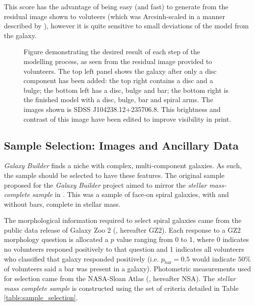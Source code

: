 \documentclass[../main.tex]{subfiles}
\begin{document}
This score has the advantage of being easy (and fast) to generate from the residual image shown to voluteers (which was Arcsinh-scaled in a manner described by \citealt{Lupton2003:astro-ph/0312483v1}), however it is quite sensitive to small deviations of the model from the galaxy.

\begin{figure}
  \caption{Figure demonstrating the desired result of each step of the modelling process, as seen from the residual image provided to volunteers. The top left panel shows the galaxy after only a disc component has been added: the top right contains a disc and a bulge; the bottom left has a disc, bulge and bar; the bottom right is the finished model with a disc, bulge, bar and spiral arms. The images shown is SDSS J104238.12+235706.8. This brightness and contrast of this image have been edited to improve visibility in print.}
  \label{fig:residualsStepByStep}
\end{figure}


\subsection{Sample Selection: Images and Ancillary Data}
\label{sec:data}

\textit{Galaxy Builder} finds a niche with complex, multi-component galaxies. As such, the sample should be selected to have these features. The original sample proposed for the \textit{Galaxy Builder} project aimed to mirror the \textit{stellar mass-complete sample} in \citet{2017MNRAS.472.2263H}. This was a sample of face-on spiral galaxies, with and without bars, complete in  stellar mass.

The morphological information required to select spiral galaxies came from the public data release of Galaxy Zoo 2 (\citealt{Willett2013:1308.3496v2}, hereafter GZ2). Each response to a GZ2 morphology question is allocated a $p$ value ranging from 0 to 1, where 0 indicates no volunteers responed positively to that question and 1 indicates all volunteers who classified that galaxy responded positively (i.e. $p_\text{bar} = 0.5$ would indicate $50\%$ of volunteers said a bar was present in a galaxy). Photometric measurements used for selection came from the NASA-Sloan Atlas (\citealt{2011AJ....142...31B}, hereafter NSA). The \textit{stellar mass complete sample} is constructed using the set of criteria detailed in Table \ref{table:sample_selection}.
\end{document}
